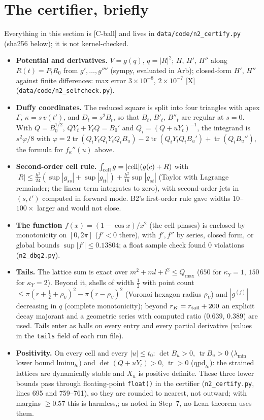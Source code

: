 \documentclass[10pt]{article}
\newcommand{\tier}[1]{\textsf{[#1]}}
\newcommand{\tX}{\tier{X}}
\newcommand{\tCb}{\textcolor{blue!60!black}{\textsf{[C-ball]}}}
\newcommand{\tr}{\operatorname{tr}}
\begin{document}
\section{The certifier, briefly}\label{sec:engine}
Everything in this section is \tCb{} and lives in \texttt{data/code/n2\_certify.py} (sha256 below); it is not kernel-checked.
\begin{itemize}\itemsep=1pt
\item \textbf{Potential and derivatives.} $V=g(q)$, $q=|R|^2$; $H$, $H'$, $H''$ along $R(t)=P_tR_0$ from $g',\dots,g''''$ (sympy, evaluated in Arb); closed-form $H'$, $H''$ against finite differences: max error $3\times10^{-8}$, $2\times10^{-7}$ \tX{} (\texttt{data/code/n2\_selfcheck.py}).
\item \textbf{Duffy coordinates.} The reduced square is split into four triangles with apex $\Gamma$, $\kappa=s\,v(t')$, and $D_t=s^2B_t$, so that $B_t$, $B'_t$, $B''_t$ are regular at $s=0$. With $Q=B_0^{1/2}$, $QY_t+Y_tQ=B_0'$ and $Q_i=(Q+uY_t)^{-1}$, the integrand is $s^2\varphi/8$ with $\varphi=2\tr(Q_iY_tQ_iY_tQ_iB_u)-2\tr(Q_iY_tQ_iB_u')+\tr(Q_iB_u'')$, the formula for $f_\kappa''(u)$ above.
\item \textbf{Second-order cell rule.} $\int_{\rm cell}g=|{\rm cell}|(g(c)+R)$ with $|R|\le\tfrac{h^2}{24}(\sup|g_{ss}|+\sup|g_{tt}|)+\tfrac{h^2}{16}\sup|g_{st}|$ (Taylor with Lagrange remainder; the linear term integrates to zero), with second-order jets in $(s,t')$ computed in forward mode. B2's first-order rule gave widths $10$--$100\times$ larger and would not close.
\item \textbf{The function $f(x)=(1-\cos x)/x^2$} (the cell phases) is enclosed by monotonicity on $[0,2\pi]$ ($f'<0$ there), with $f',f''$ by series, closed form, or global bounds $\sup|f'|\le0.13804$; a float sample check found 0 violations (\texttt{n2\_dbg2.py}).
\item \textbf{Tails.} The lattice sum is exact over $m^2+ml+l^2\le Q_{\max}$ ($650$ for $\kappa_Y=1$, $150$ for $\kappa_Y=2$). Beyond it, shells of width $\tfrac12$ with point count $\le\pi(r+\tfrac12+\rho_V)^2-\pi(r-\rho_V)^2$ (Voronoi hexagon radius $\rho_V$) and $|g^{(j)}|$ decreasing in $q$ (complete monotonicity); beyond $r_K=r_{\rm tail}+200$ an explicit decay majorant and a geometric series with computed ratio ($0.639$, $0.389$) are used. Tails enter as balls on every entry and every partial derivative (values in the \texttt{tails} field of each run file).
\item \textbf{Positivity.} On every cell and every $|u|\le t_0$: $\det B_u>0$, $\tr B_u>0$ ($\lambda_{\min}$ lower bound $\mathrm{lminu}_{lo}$) and $\det(Q+uY_t)>0$, $\tr>0$ ($\mathrm{qpd}_{lo}$): the strained lattices are dynamically stable and $X_u$ is positive definite. These three lower bounds pass through floating-point \texttt{float()} in the certifier (\texttt{n2\_certify.py}, lines 695 and 759--761), so they are rounded to nearest, not outward; with margins $\ge0.57$ this is harmless,; as noted in Step~7, no Lean theorem uses them.
\end{itemize}
\end{document}
